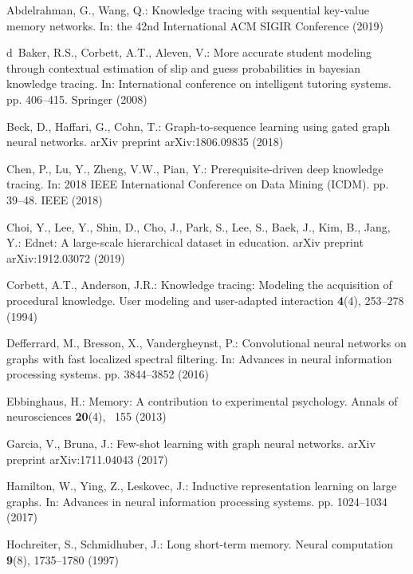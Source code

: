\documentclass[runningheads]{llncs}
\begin{document}
	
\begin{thebibliography}{10}
	Abdelrahman, G., Wang, Q.: Knowledge tracing with sequential key-value memory
	networks. In: the 42nd International ACM SIGIR Conference (2019)
	
	d~Baker, R.S., Corbett, A.T., Aleven, V.: More accurate student modeling
	through contextual estimation of slip and guess probabilities in bayesian
	knowledge tracing. In: International conference on intelligent tutoring
	systems. pp. 406--415. Springer (2008)
	
	Beck, D., Haffari, G., Cohn, T.: Graph-to-sequence learning using gated graph
	neural networks. arXiv preprint arXiv:1806.09835  (2018)
	
	Chen, P., Lu, Y., Zheng, V.W., Pian, Y.: Prerequisite-driven deep knowledge
	tracing. In: 2018 IEEE International Conference on Data Mining (ICDM). pp.
	39--48. IEEE (2018)
	
	Choi, Y., Lee, Y., Shin, D., Cho, J., Park, S., Lee, S., Baek, J., Kim, B.,
	Jang, Y.: Ednet: A large-scale hierarchical dataset in education. arXiv
	preprint arXiv:1912.03072  (2019)
	
	Corbett, A.T., Anderson, J.R.: Knowledge tracing: Modeling the acquisition of
	procedural knowledge. User modeling and user-adapted interaction
	\textbf{4}(4),  253--278 (1994)
	
	Defferrard, M., Bresson, X., Vandergheynst, P.: Convolutional neural networks
	on graphs with fast localized spectral filtering. In: Advances in neural
	information processing systems. pp. 3844--3852 (2016)
	
	Ebbinghaus, H.: Memory: A contribution to experimental psychology. Annals of
	neurosciences  \textbf{20}(4), ~155 (2013)
	
	Garcia, V., Bruna, J.: Few-shot learning with graph neural networks. arXiv
	preprint arXiv:1711.04043  (2017)
	
	Hamilton, W., Ying, Z., Leskovec, J.: Inductive representation learning on
	large graphs. In: Advances in neural information processing systems. pp.
	1024--1034 (2017)
	
	Hochreiter, S., Schmidhuber, J.: Long short-term memory. Neural computation
	\textbf{9}(8),  1735--1780 (1997)
	

\end{thebibliography}
\end{document}

